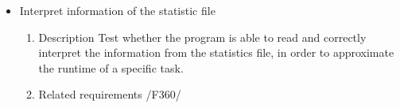 {\begin{itemize}
				
				
				
				
				
				\item Interpret information of the statistic file
				\begin{enumerate}
					\item Description\newline
Test whether the program is able to read and correctly interpret the information from the statistics file, in order to approximate the runtime of a specific task.
					\item Related requirements\newline
					/F360/
				\end{enumerate}
				
		\end{itemize}		
		
				
		
				
}
